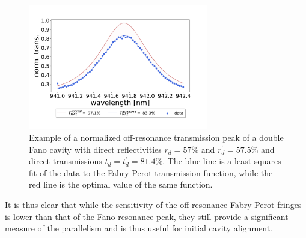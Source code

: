 \begin{figure}[h!]
    \centering
    \includegraphics[width=0.7\textwidth]{figures/parallelism_plot.pdf}
    \caption{Example of a normalized off-resonance transmission peak of a double Fano cavity with direct reflectivities $r_d = 57\%$ and $r_d^{\prime}=57.5\%$ and direct transmissions $t_d = t_d^{\prime} = 81.4\%$. The blue line is a least squares fit of the data to the Fabry-Perot transmission function, while the red line is the optimal value of the same function.}
    \label{fig:parallelism_plot}
\end{figure}

It is thus clear that while the sensitivity of the off-resonance Fabry-Perot fringes is lower than that of the Fano resonance peak, they still provide a significant measure of the parallelism and is thus useful for initial cavity alignment.
